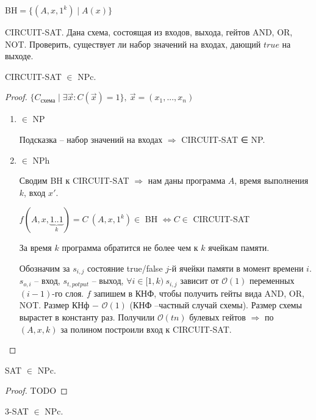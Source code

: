 BH$=\{(A,x,1^k)\mid A(x)\}$

\begin{definition}
    CIRCUIT-SAT. Дана схема, состоящая из входов, выхода, гейтов AND, OR, NOT. Проверить, существует ли набор значений на входах, дающий $true$ на выходе.
\end{definition}

\begin{theorem}
    CIRCUIT-SAT $\in$ NPc.
\end{theorem}

\begin{proof}
    $\{C_{\text{схема}}\mid \exists \vec{x}: C(\vec{x})=1\},\ \vec{x}=(x_1,...,x_n)$

    \begin{enumerate}
        \item[\circ] $\in$ NP

        Подсказка – набор значений на входах $\Rightarrow$ CIRCUIT-SAT ∈ NP.

        \item[\circ] $\in$ NPh

        Сводим BH к CIRCUIT-SAT $\Rightarrow$ нам даны программа $A$, время выполнения $k$, вход $x'$.

        $f(A,x,\underbrace{1..1}_{k})=C\ (A,x,1^k)\in$ BH $\Leftrightarrow C\in$ CIRCUIT-SAT

        За время $k$ программа обратится не более чем к $k$ ячейкам памяти.

        Обозначим за $s_{i,j}$ состояние true/false $j$-й ячейки памяти в момент времени $i$.
        $s_{o,i}$ – вход, $s_{t,potput}$ – выход, $\forall i\in [1,k)\ s_{i,j}$ зависит от $\mathcal{O}(1)$ переменных $(i−1)$-го слоя.  $f$ запишем в КНФ, чтобы получить гейты вида AND, OR, NOT. Размер КНф $-$ $\mathcal{O}(1)$ (КНФ –частный случай схемы). Размер схемы вырастет в константу раз. Получили $\mathcal{O}(tn)$ булевых гейтов $\Rightarrow$ по $(A,x,k)$ за полином построили вход к CIRCUIT-SAT.
    \end{enumerate}
\end{proof}

\begin{theorem}
    SAT $\in$ NPc.
\end{theorem}

\begin{proof}
    TODO
\end{proof}

\begin{theorem}
    3-SAT $\in$ NPc.
\end{theorem}

